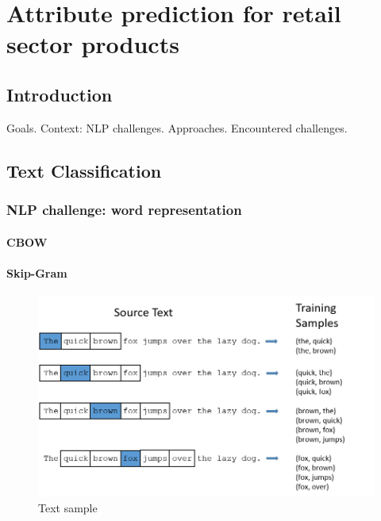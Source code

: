 \chapter{Attribute prediction for retail sector products} %
\label{cha:attribute_prediction_for_retail_sector_products}

\section{Introduction} %
\label{sec:introduction}

Goals.
Context: NLP challenges.
Approaches.
Encountered challenges. 

\section{Text Classification} %
\label{sec:}

\subsection{NLP challenge: word representation}


\subsubsection{CBOW}

\subsubsection{Skip-Gram}

\begin{figure}
  \includegraphics[width=\linewidth]{images/skip-gram.png}
  \caption{Text sample}
  \label{fig:sample}
\end{figure}

